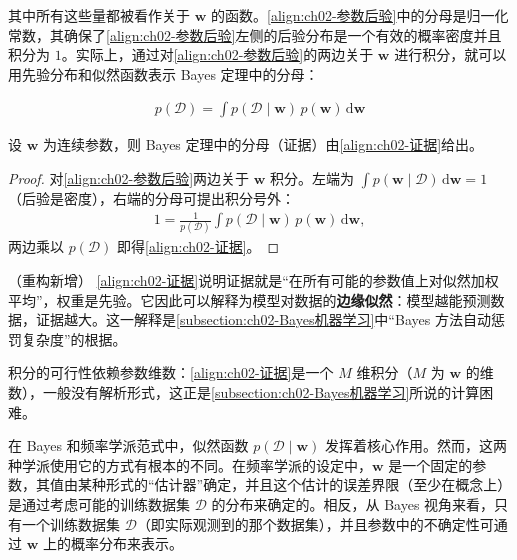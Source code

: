 \documentclass[../../main.tex]{subfiles}
\begin{document}
其中所有这些量都被看作关于 $\mathbf{w}$ 的函数。\eqref{align:ch02-参数后验}中的分母是归一化常数，其确保了\eqref{align:ch02-参数后验}左侧的后验分布是一个有效的概率密度并且积分为 $1$。实际上，通过对\eqref{align:ch02-参数后验}的两边关于 $\mathbf{w}$ 进行积分，就可以用先验分布和似然函数表示 Bayes 定理中的分母：

\begin{align}
  p(\mathcal{D}) = \int p(\mathcal{D}\mid\mathbf{w})\,p(\mathbf{w})\,\mathrm{d}\mathbf{w}
  \label{align:ch02-证据}
\end{align}

\begin{proposition}[证据的边缘化表示]\label{proposition:ch02-证据}
设 $\mathbf{w}$ 为连续参数，则 Bayes 定理中的分母（证据）由\eqref{align:ch02-证据}给出。
\end{proposition}

\begin{proof}
对\eqref{align:ch02-参数后验}两边关于 $\mathbf{w}$ 积分。左端为 $\int p(\mathbf{w}\mid\mathcal{D})\,\mathrm{d}\mathbf{w}=1$（后验是密度），右端的分母可提出积分号外：
\begin{align*}
  1 = \frac{1}{p(\mathcal{D})}\int p(\mathcal{D}\mid\mathbf{w})\,p(\mathbf{w})\,\mathrm{d}\mathbf{w} ,
\end{align*}
两边乘以 $p(\mathcal{D})$ 即得\eqref{align:ch02-证据}。
\end{proof}

\begin{remark}（重构新增）
\eqref{align:ch02-证据}说明证据就是“在所有可能的参数值上对似然加权平均”，权重是先验。它因此可以解释为模型对数据的\textbf{边缘似然}：模型越能预测数据，证据越大。这一解释是\cref{subsection:ch02-Bayes机器学习}中“Bayes 方法自动惩罚复杂度”的根据。

积分的可行性依赖参数维数：\eqref{align:ch02-证据}是一个 $M$ 维积分（$M$ 为 $\mathbf{w}$ 的维数），一般没有解析形式，这正是\cref{subsection:ch02-Bayes机器学习}所说的计算困难。
\end{remark}

在 Bayes 和频率学派范式中，似然函数 $p(\mathcal{D}\mid\mathbf{w})$ 发挥着核心作用。然而，这两种学派使用它的方式有根本的不同。在频率学派的设定中，$\mathbf{w}$ 是一个固定的参数，其值由某种形式的“估计器”确定，并且这个估计的误差界限（至少在概念上）是通过考虑可能的训练数据集 $\mathcal{D}$ 的分布来确定的。相反，从 Bayes 视角来看，只有一个训练数据集 $\mathcal{D}$（即实际观测到的那个数据集），并且参数中的不确定性可通过 $\mathbf{w}$ 上的概率分布来表示。
\end{document}
